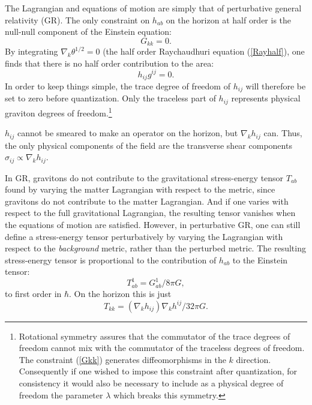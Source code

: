 \documentclass{article}
\begin{document}
The Lagrangian and equations of motion are simply that of perturbative general relativity (GR).  The only constraint on $h_{ab}$ on the horizon at half order is the null-null component of the Einstein equation:
\begin{equation}\label{Gkk}
G_{kk} = 0.
\end{equation}
By integrating $\nabla_k \theta^{1/2} = 0$ (the half order Raychaudhuri equation (\ref{Rayhalf}), one finds that there is no half order contribution to the area:
\begin{equation}\label{freeze}
h_{ij} g^{ij} = 0.
\end{equation}
In order to keep things simple, the trace degree of freedom of $h_{ij}$ will therefore be set to zero before quantization.  Only the traceless part of $h_{ij}$ represents physical graviton degrees of freedom.\footnote{Rotational symmetry assures that the commutator of the trace degrees of freedom cannot mix with the commutator of the traceless degrees of freedom.  The constraint (\ref{Gkk}) generates diffeomorphisms in the $k$ direction.  Consequently if one wished to impose this constraint after quantization, for consistency it would also be necessary to include as a physical degree of freedom the parameter $\lambda$ which breaks this symmetry.}

$h_{ij}$ cannot be smeared to make an operator on the horizon, but $\nabla_k h_{ij}$ can.  Thus, the only physical components of the field are the transverse shear components $\sigma_{ij} \propto \nabla_k h_{ij}$.

In GR, gravitons do not contribute to the gravitational stress-energy tensor $T_{ab}$ found by varying the matter Lagrangian with respect to the metric, since gravitons do not contribute to the matter Lagrangian.  And if one varies with respect to the full gravitational Lagrangian, the resulting tensor vanishes when the equations of motion are satisfied.  However, in perturbative GR, one can still define a stress-energy tensor perturbatively by varying the Lagrangian with respect to the \emph{background} metric, rather than the perturbed metric.  The resulting stress-energy tensor is proportional to the contribution of $h_{ab}$ to the Einstein tensor:
\begin{equation}
T_{ab}^1 = G_{ab}^{1} / 8\pi G,
\end{equation}
to first order in $\hbar$.  On the horizon this is just
\begin{equation}\label{gravT}
T_{kk} = (\nabla_k h_{ij}) \nabla_k h^{ij} / 32\pi G.
\end{equation}
\end{document}
